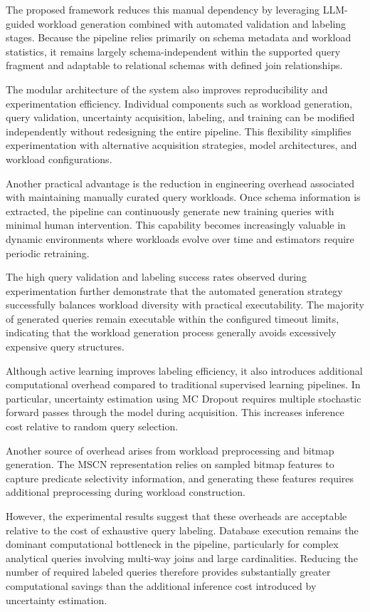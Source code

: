 The proposed framework reduces this manual dependency by leveraging LLM-guided workload generation combined with automated validation and labeling stages. Because the pipeline relies primarily on schema metadata and workload statistics, it remains largely schema-independent within the supported query fragment and adaptable to relational schemas with defined join relationships.

The modular architecture of the system also improves reproducibility and experimentation efficiency. Individual components such as workload generation, query validation, uncertainty acquisition, labeling, and training can be modified independently without redesigning the entire pipeline. This flexibility simplifies experimentation with alternative acquisition strategies, model architectures, and workload configurations.

Another practical advantage is the reduction in engineering overhead associated with maintaining manually curated query workloads. Once schema information is extracted, the pipeline can continuously generate new training queries with minimal human intervention. This capability becomes increasingly valuable in dynamic environments where workloads evolve over time and estimators require periodic retraining.

The high query validation and labeling success rates observed during experimentation further demonstrate that the automated generation strategy successfully balances workload diversity with practical executability. The majority of generated queries remain executable within the configured timeout limits, indicating that the workload generation process generally avoids excessively expensive query structures.

Although active learning improves labeling efficiency, it also introduces additional computational overhead compared to traditional supervised learning pipelines. In particular, uncertainty estimation using MC Dropout requires multiple stochastic forward passes through the model during acquisition. This increases inference cost relative to random query selection.

Another source of overhead arises from workload preprocessing and bitmap generation. The MSCN representation relies on sampled bitmap features to capture predicate selectivity information, and generating these features requires additional preprocessing during workload construction.

However, the experimental results suggest that these overheads are acceptable relative to the cost of exhaustive query labeling. Database execution remains the dominant computational bottleneck in the pipeline, particularly for complex analytical queries involving multi-way joins and large cardinalities. Reducing the number of required labeled queries therefore provides substantially greater computational savings than the additional inference cost introduced by uncertainty estimation.

